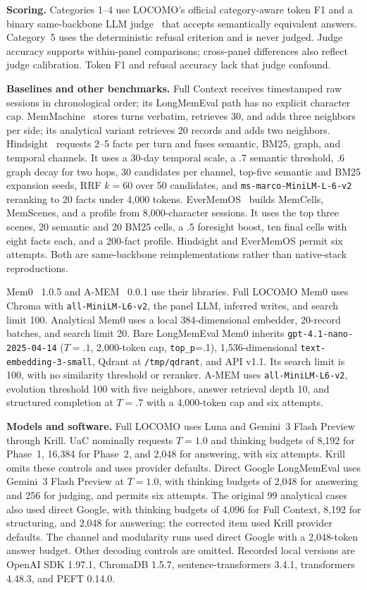 \textbf{Scoring.} Categories 1--4 use LOCOMO's official category-aware token F1 and a binary same-backbone LLM judge~\citep{zheng2023mtbench} that accepts semantically equivalent answers. Category~5 uses the deterministic refusal criterion and is never judged. Judge accuracy supports within-panel comparisons; cross-panel differences also reflect judge calibration. Token F1 and refusal accuracy lack that judge confound.

\textbf{Baselines and other benchmarks.} Full Context receives timestamped raw sessions in chronological order; its LongMemEval path has no explicit character cap. MemMachine~\citep{wang2026memmachine} stores turns verbatim, retrieves 30, and adds three neighbors per side; its analytical variant retrieves 20 records and adds two neighbors. Hindsight~\citep{latimer2025hindsight} requests 2--5 facts per turn and fuses semantic, BM25, graph, and temporal channels. It uses a 30-day temporal scale, a .7 semantic threshold, .6 graph decay for two hops, 30 candidates per channel, top-five semantic and BM25 expansion seeds, RRF $k{=}60$ over 50 candidates, and \texttt{ms-marco-MiniLM-L-6-v2} reranking to 20 facts under 4,000 tokens. EverMemOS~\citep{hu2026evermemos} builds MemCells, MemScenes, and a profile from 8,000-character sessions. It uses the top three scenes, 20 semantic and 20 BM25 cells, a .5 foresight boost, ten final cells with eight facts each, and a 200-fact profile. Hindsight and EverMemOS permit six attempts. Both are same-backbone reimplementations rather than native-stack reproductions.

Mem0~\citep{chhikara2025mem0} 1.0.5 and A-MEM~\citep{xu2025amem} 0.0.1 use their libraries. Full LOCOMO Mem0 uses Chroma with \texttt{all-MiniLM-L6-v2}, the panel LLM, inferred writes, and search limit 100. Analytical Mem0 uses a local 384-dimensional embedder, 20-record batches, and search limit 20. Bare LongMemEval Mem0 inherits \texttt{gpt-4.1-nano-2025-04-14} ($T=.1$, 2,000-token cap, \texttt{top\_p}=.1), 1,536-dimensional \texttt{text-embedding-3-small}, Qdrant at \texttt{/tmp/qdrant}, and API v1.1. Its search limit is 100, with no similarity threshold or reranker. A-MEM uses \texttt{all-MiniLM-L6-v2}, evolution threshold 100 with five neighbors, answer retrieval depth 10, and structured completion at $T=.7$ with a 4,000-token cap and six attempts.

\textbf{Models and software.} Full LOCOMO uses Luna and Gemini~3 Flash Preview through Krill. UaC nominally requests $T=1.0$ and thinking budgets of 8,192 for Phase~1, 16,384 for Phase~2, and 2,048 for answering, with six attempts. Krill omits these controls and uses provider defaults. Direct Google LongMemEval uses Gemini~3 Flash Preview at $T=1.0$, with thinking budgets of 2,048 for answering and 256 for judging, and permits six attempts. The original 99 analytical cases also used direct Google, with thinking budgets of 4,096 for Full Context, 8,192 for structuring, and 2,048 for answering; the corrected item used Krill provider defaults. The channel and modularity runs used direct Google with a 2,048-token answer budget. Other decoding controls are omitted. Recorded local versions are OpenAI SDK 1.97.1, ChromaDB 1.5.7, sentence-transformers 3.4.1, transformers 4.48.3, and PEFT 0.14.0.

